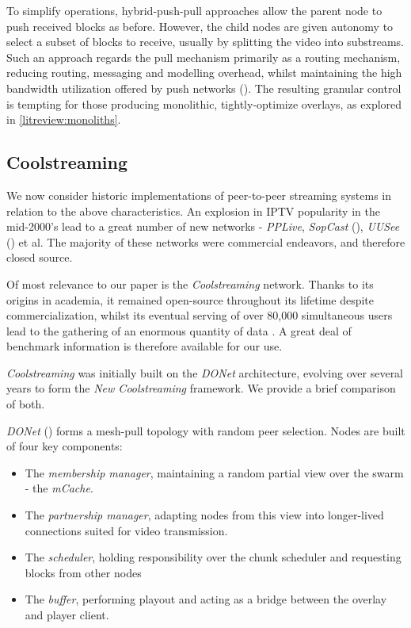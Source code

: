\documentclass[12pt,a4paper]{article}
\begin{document}
To simplify operations, hybrid-push-pull approaches allow the parent node to push received blocks as before. However, the child nodes are given autonomy to select a subset of blocks to receive, usually by splitting the video into substreams. Such an approach regards the pull mechanism primarily as a routing mechanism, reducing routing, messaging and modelling overhead, whilst maintaining the high bandwidth utilization offered by push networks (\cite{Zhang2007}). The resulting granular control is tempting for those producing monolithic, tightly-optimize overlays, as explored in \ref{litreview:monoliths}.

\subsection{Coolstreaming} \label{litreview:coolstreaming}
We now consider historic implementations of peer-to-peer streaming systems in relation to the above characteristics. An explosion in IPTV popularity in the mid-2000's lead to a great number of new networks - \textit{PPLive}, \textit{SopCast} (\cite{SopCast2019}), \textit{UUSee} (\cite{UUSee2007}) et al. The majority of these networks were commercial endeavors, and therefore closed source.

Of most relevance to our paper is the \textit{Coolstreaming} network. Thanks to its origins in academia, it remained open-source throughout its lifetime despite commercialization, whilst its eventual serving of over 80,000 simultaneous users lead to the gathering of an enormous quantity of data \cite{Li2007}. A great deal of benchmark information is therefore available for our use.

\textit{Coolstreaming} was initially built on the \textit{DONet} architecture, evolving over several years to form the \textit{New Coolstreaming} framework. We provide a brief comparison of both.

\textit{DONet} (\cite{Zhang2005}) forms a mesh-pull topology with random peer selection. Nodes are built of four key components:

\begin{itemize}
	\item The \textit{membership manager}, maintaining a random partial view over the swarm - the \textit{mCache}.
	\item The \textit{partnership manager}, adapting nodes from this view into longer-lived connections suited for video transmission.
	\item The \textit{scheduler}, holding responsibility over the chunk scheduler and requesting blocks from other nodes
	\item The \textit{buffer}, performing playout and acting as a bridge between the overlay and player client.
\end{itemize} 
\end{document}
